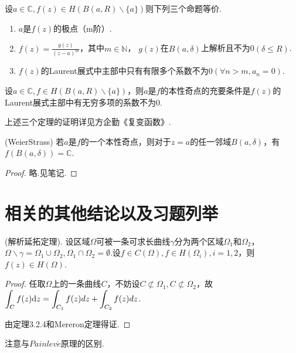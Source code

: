 \begin{theorem}
	设$\displaystyle{a \in \mathbb{C}, f(z) \in H(B(a, R) \backslash \{ a\})}$则下列三个命题等价.
	\begin{enumerate} [(1)]
		\item $\displaystyle{a}$是$\displaystyle{f(z)}$的极点（m阶）.
		\item $\displaystyle{f(z) = \frac{g(z)}{(z - a) ^ m}}$，其中$\displaystyle{m \in \mathbb{N}}$， $\displaystyle{g(z)}$在$\displaystyle{B(a, \delta)}$上解析且不为0$\displaystyle{(\delta \leq R)}$.
		\item $\displaystyle{f(z)}$的{\rm Laurent}展式中主部中只有有限多个系数不为0$\displaystyle{(\forall n > m, a_n = 0)}$.
		
	\end{enumerate}
\end{theorem}

\begin{theorem}
	设$\displaystyle{a \in \mathbb{C}, f \in H(B(a, R) \backslash \{a\})}$，则$\displaystyle{a}$是$\displaystyle{f}$的本性奇点的充要条件是$\displaystyle{f(z)}$的{\rm Laurent}展式主部中有无穷多项的系数不为0.
\end{theorem}
上述三个定理的证明详见方企勤《复变函数》.

\begin{theorem}
	\color{blue}
	(WeierStrass)
	\color{black}
	若$\displaystyle{a}$是$\displaystyle{f}$的一个本性奇点，则对于$\displaystyle{z=a}$的任一邻域$\displaystyle{B(a, \delta)}$，有$\displaystyle{f(B(a, \delta)) = \mathbb{C}}$.
\end{theorem}
\begin{proof}
	略.见笔记.
\end{proof}

\section{相关的其他结论以及习题列举}
\begin{theorem}
	\color{blue}
	(解析延拓定理).
	\color{black}
	设区域$\displaystyle{\Omega}$可被一条可求长曲线$\displaystyle{\gamma}$分为两个区域$\displaystyle{\Omega_1}$和$\displaystyle{\Omega_2}$，$\displaystyle{\Omega {\backslash} \gamma = \Omega_1 \cup \Omega_2, \Omega_1 \cap \Omega_2 = \emptyset}$.设$\displaystyle{f \in C(\Omega), f \in H(\Omega_i), i = 1,2}$，则$\displaystyle{f(z) \in H(\Omega)}$.
\end{theorem}
\begin{proof}
	任取$\displaystyle{\Omega}$上的一条曲线$\displaystyle{C}$，不妨设$\displaystyle{C \not\subset \Omega_1, C \not\subset \Omega_2}$，故$\displaystyle{\int_C f(z) \mathrm{d}z  = \int_{C_1} f(z) dz + \int_{C_2} f(z)dz}$.
	
	由定理3.2.4和{\rm Mereron}定理得证.
\end{proof}
注意与$Painlev\acute{e}$原理的区别.

